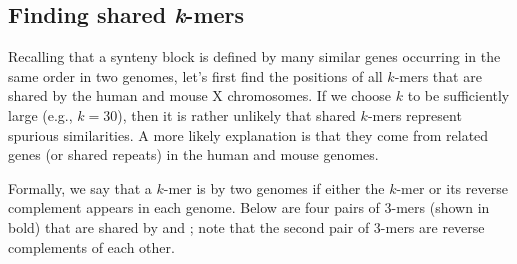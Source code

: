 \subsection{Finding shared \emph{k}-mers}
\label{subsec:finding_shared_k-mers}

Recalling that a synteny block is defined by many similar genes occurring in the same order in two genomes, let's first find the positions of all $k$-mers that are shared by the human and mouse X chromosomes. If we choose $k$ to be sufficiently large (e.g., $k = 30$), then it is rather unlikely that shared $k$-mers represent spurious similarities. A more likely explanation is that they come from related genes (or shared repeats) in the human and mouse genomes.

Formally, we say that a $k$-mer is  by two genomes if either the $k$-mer or its reverse complement appears in each genome. Below are four pairs of 3-mers (shown in bold) that are shared by  and ; note that the second pair of 3-mers are reverse complements of each other.

